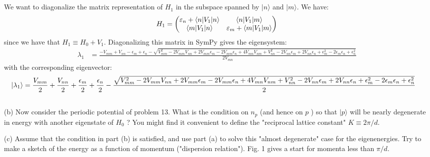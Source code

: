 \documentclass[12pt]{article}
\begin{document}
\subsection{}
We want to diagonalize the matrix representation of $H_{1}$ in the subspace spanned by $|n\rangle$ and $|m\rangle$. We have:
\begin{equation}
  H_{1}=\mqty(\varepsilon_{n}+\langle n|V_1| n\rangle & \langle n|V_1| m\rangle\\
  \langle m|V_1| n\rangle & \varepsilon_{m}+\langle m|V_1| m\rangle)
\end{equation}
since we have that $H_1 \equiv H_0 + V_1$.
Diagonalizing this matrix in SymPy gives the eigensystem:
\begin{equation}
  \begin{aligned}
    \lambda _{1} &= \frac{- V_{mm} + V_{nn} - \epsilon_{m} + \epsilon_{n} - \sqrt{V_{mm}^{2} - 2 V_{mm} V_{nn} + 2 V_{mm} \epsilon_{m} - 2 V_{mm} \epsilon_{n} + 4 V_{mn} V_{nm} + V_{nn}^{2} - 2 V_{nn} \epsilon_{m} + 2 V_{nn} \epsilon_{n} + \epsilon_{m}^{2} - 2 \epsilon_{m} \epsilon_{n} + \epsilon_{n}^{2}}}{2 V_{mn}}
  \end{aligned}
\end{equation}
with the corresponding eigenvector:
\begin{equation}
  \begin{aligned}
    \ket{\lambda _{1}} &= \frac{V_{mm}}{2} + \frac{V_{nn}}{2} + \frac{\epsilon_{m}}{2} + \frac{\epsilon_{n}}{2} - \frac{\sqrt{V_{mm}^{2} - 2 V_{mm} V_{nn} + 2 V_{mm} \epsilon_{m} - 2 V_{mm} \epsilon_{n} + 4 V_{mn} V_{nm} + V_{nn}^{2} - 2 V_{nn} \epsilon_{m} + 2 V_{nn} \epsilon_{n} + \epsilon_{m}^{2} - 2 \epsilon_{m} \epsilon_{n} + \epsilon_{n}^{2}}}{2}
  \end{aligned}
\end{equation}



\subsection{}
(b) Now consider the periodic potential of problem 13. What is the condition on $n_{p}$ (and hence on $p$ ) so that $|p\rangle$ will be nearly degenerate in energy with another eigenstate of $H_{0}$ ? You might find it convenient to define the "reciprocal lattice constant" $K \equiv 2 \pi / d$.

(c) Assume that the condition in part (b) is satisfied, and use part (a) to solve this "almost degenerate" case for the eigenenergies. Try to make a sketch of the energy as a function of momentum ("dispersion relation"). Fig. 1 gives a start for momenta less than $\pi / d$.
\end{document}
